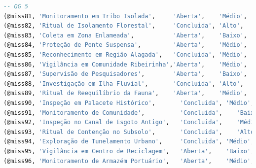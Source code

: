 \documentclass[12pt,a4paper]{report}
\begin{document}
\begin{lstlisting}[language=SQL, caption=population.sql]
-- QG 5
(@miss81, 'Monitoramento em Tribo Isolada',     'Aberta',    'Médio',  'Verificar contatos místicos',       '2025-05-22 06:00:00', NULL,         @addr81, @hq5),
(@miss82, 'Ritual de Isolamento Florestal',     'Concluida', 'Alto',   'Selar zona contaminada',            '2025-03-18 21:00:00', '2025-04-19', @addr82, @hq5),
(@miss83, 'Coleta em Zona Enlameada',           'Aberta',    'Baixo',  'Extrair lama simbiótica',           '2025-05-24 10:00:00', NULL,         @addr83, @hq5),
(@miss84, 'Proteção de Ponte Suspensa',         'Aberta',    'Médio',  'Evitar manifestação aquática',      '2025-05-25 07:30:00', NULL,         @addr84, @hq5),
(@miss85, 'Reconhecimento em Região Alagada',   'Concluida', 'Médio',  'Avaliar presença de portais',       '2025-04-25 15:00:00', '2025-05-06', @addr85, @hq5),
(@miss86, 'Vigilância em Comunidade Ribeirinha','Aberta',    'Médio',  'Monitorar ondas energéticas',       '2025-05-28 08:00:00', NULL,         @addr86, @hq5),
(@miss87, 'Supervisão de Pesquisadores',        'Aberta',    'Baixo',  'Garantir segurança espiritual',     '2025-05-29 07:00:00', NULL,         @addr87, @hq5),
(@miss88, 'Investigação em Ilha Fluvial',       'Concluida', 'Alto',   'Neutralizar presença oculta',       '2025-04-27 13:00:00', '2025-05-08', @addr88, @hq5),
(@miss89, 'Ritual de Reequilíbrio da Fauna',    'Aberta',    'Médio',  'Harmonizar flora e fauna afetadas', '2025-06-02 05:00:00', NULL,         @addr89, @hq5),
(@miss90, 'Inspeção em Palacete Histórico',       'Concluida', 'Médio',  'Revisar integridade estrutural', '2025-02-20 10:00:00', '2025-02-28', @addr25, @hq5),
(@miss91, 'Monitoramento de Comunidade',          'Concluida',    'Baixo',  'Entrevistar moradores',        '2025-04-14 09:00:00', '2025-05-08',         @addr26, @hq5),
(@miss92, 'Inspeção no Canal de Esgoto Antigo',   'Concluida',    'Médio',  'Rastreamento de corrupção mística',     '2025-04-14 23:00:00', '2025-05-21',         @addr90, @hq5),
(@miss93, 'Ritual de Contenção no Subsolo',       'Concluida',    'Alto',   'Selar passagem dimensional instável',   '2025-05-02 01:00:00', '2025-05-26',         @addr91, @hq5),
(@miss94, 'Exploração de Tunelamento Urbano',     'Concluida', 'Médio',  'Analisar runas esquecidas',             '2025-04-08 04:00:00', '2025-04-29', @addr92, @hq5),
(@miss95, 'Vigilância em Centro de Reciclagem',   'Aberta',    'Baixo',  'Prevenir contaminação espiritual',      '2025-05-24 05:30:00', NULL,         @addr93, @hq5),
(@miss96, 'Monitoramento de Armazém Portuário',   'Aberta',    'Médio',  'Verificar fluxos arcanos ilegais',      '2025-05-26 02:00:00', NULL,         @addr94, @hq5),

\end{lstlisting}
\end{document}
